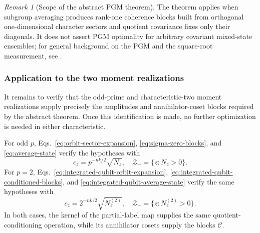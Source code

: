 \documentclass[11pt]{article}
\newcommand{\1}{\mathbf 1}
\theoremstyle{plain}
\theoremstyle{definition}
\theoremstyle{remark}
\newtheorem{remark}[theorem]{Remark}
\begin{document}
\begin{remark}[Scope of the abstract PGM theorem]
The theorem applies when subgroup averaging produces rank-one coherence blocks
built from orthogonal one-dimensional character sectors and quotient covariance
fixes only their diagonals.  It does not assert PGM optimality for arbitrary
covariant mixed-state ensembles; for general background on the PGM and the
square-root measurement, see
\cite{HausladenWootters1994PGM,EldarForney2001SRM,ItenRenesSutter2017PGM}.
\end{remark}

\subsubsection{Application to the two moment realizations}
It remains to verify that the odd-prime and characteristic-two moment
realizations supply precisely the amplitudes and annihilator-coset blocks
required by the abstract theorem.  Once this identification is made, no
further optimization is needed in either characteristic.

For odd $p$, Eqs.~\eqref{eq:orbit-sector-expansion},
\eqref{eq:sigma-zero-blocks}, and \eqref{eq:average-state} verify the
hypotheses with
\begin{equation}
 c_z=p^{-nk/2}\sqrt{N_z},
 \quad
 \mathcal Z_+=\{z:N_z>0\}.
 \label{eq:odd-abstract-amplitudes}
\end{equation}
For $p=2$, Eqs.~\eqref{eq:integrated-qubit-orbit-expansion},
\eqref{eq:integrated-qubit-conditioned-blocks}, and
\eqref{eq:integrated-qubit-average-state} verify the same hypotheses with
\begin{equation}
 c_z=2^{-nk/2}\sqrt{N_z^{(2)}},
 \quad
 \mathcal Z_+=\{z:N_z^{(2)}>0\}.
 \label{eq:binary-abstract-amplitudes}
\end{equation}
In both cases, the kernel of the partial-label map supplies the same quotient-conditioning
operation, while its annihilator cosets supply the blocks $\mathcal C$.
\end{document}
